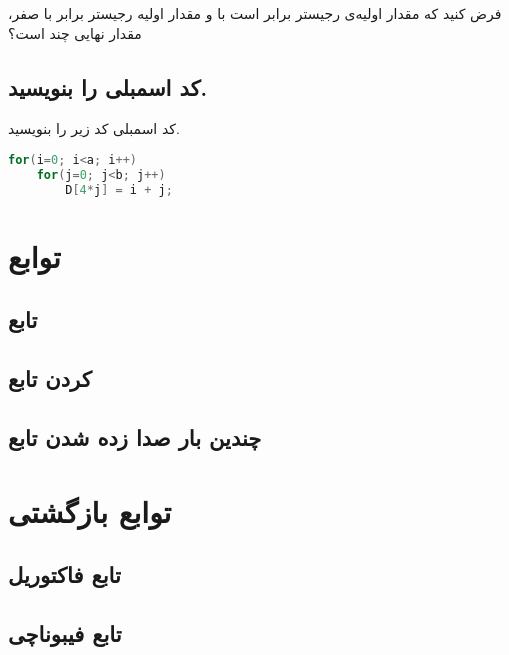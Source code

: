 \documentclass[11pt, dvipsnames, svgnames, x11names]{article}
\begin{document}
فرض کنید که مقدار اولیه‌ی رجیستر
برابر است با 
و مقدار اولیه رجیستر  برابر با صفر، مقدار نهایی 
چند است؟
\subsection{کد اسمبلی را بنویسید.}
کد اسمبلی کد زیر را بنویسید.
\begin{latin}
\begin{lstlisting}[language=c]
for(i=0; i<a; i++)
    for(j=0; j<b; j++)
        D[4*j] = i + j;
\end{lstlisting}
\end{latin}

\section{توابع}
\subsection{تابع }
\subsection{ کردن تابع}
\subsection{چندین‌ بار صدا زده شدن تابع}

\section{توابع بازگشتی}
\subsection{تابع فاکتوریل}
\subsection{تابع فیبوناچی}
\end{document}
